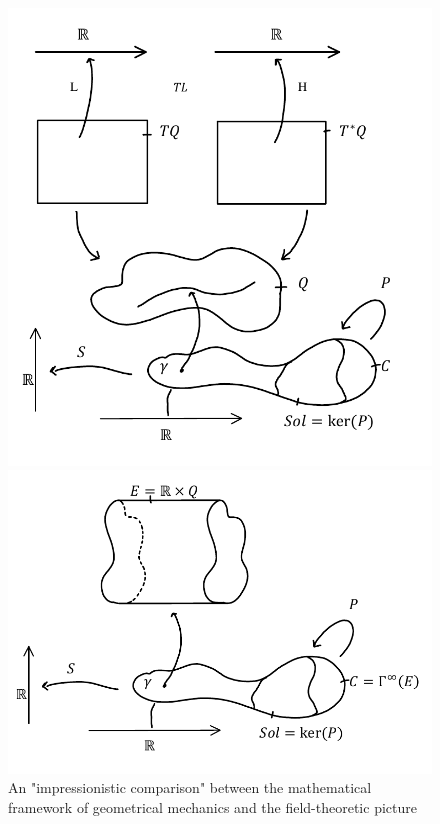 \documentclass[Main]{subfiles}
\begin{document}
		\begin{figure}[h!]
		\centering
		\begin{minipage}{0.45\textwidth}
			\centering
			\includegraphics[width=\textwidth]{Pictures/GeoMecFrame} 
		\end{minipage}\hfill
		\begin{minipage}{0.45\textwidth}
			\centering
			\includegraphics[width=\textwidth]{Pictures/FieMecFrame} 
		\end{minipage}
		\caption{An "impressionistic comparison"  between the mathematical framework of geometrical mechanics and  the field-theoretic picture}
		\end{figure}
	
\end{document}
